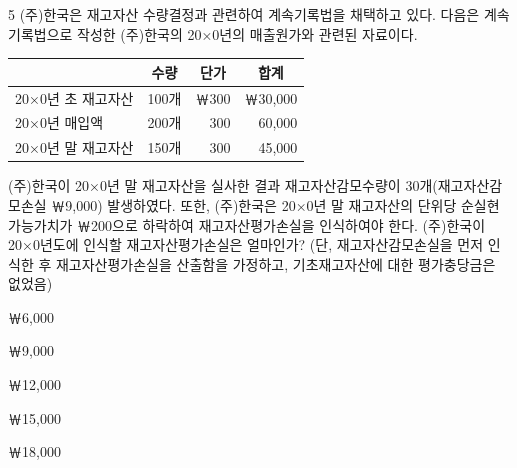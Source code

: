 \begin{question}{5}
(주)한국은 재고자산 수량결정과 관련하여 계속기록법을 채택하고 있다. 다음은 계속기록법으로 작성한 (주)한국의 20×0년의 매출원가와 관련된 자료이다.

{\small\centering
\begin{tabular}{|l|r|r|r|}
\hline
 & \multicolumn{1}{c|}{수량} & \multicolumn{1}{c|}{단가} & \multicolumn{1}{c|}{합계} \\
\hline
20×0년 초 재고자산 & 100개 & ￦300 & ￦30,000 \\
\hline
20×0년 매입액 & 200개 & 300 & 60,000 \\
\hline
20×0년 말 재고자산 & 150개 & 300 & 45,000 \\
\hline
\end{tabular}\par}

(주)한국이 20×0년 말 재고자산을 실사한 결과 재고자산감모수량이 30개(재고자산감모손실 ￦9,000) 발생하였다. 또한, (주)한국은 20×0년 말 재고자산의 단위당 순실현가능가치가 ￦200으로 하락하여 재고자산평가손실을 인식하여야 한다. (주)한국이 20×0년도에 인식할 재고자산평가손실은 얼마인가? (단, 재고자산감모손실을 먼저 인식한 후 재고자산평가손실을 산출함을 가정하고, 기초재고자산에 대한 평가충당금은 없었음)
\begin{choices}
  \item ￦6,000
  \item ￦9,000
  \item ￦12,000
  \item ￦15,000
  \item ￦18,000
\end{choices}
\end{question}
